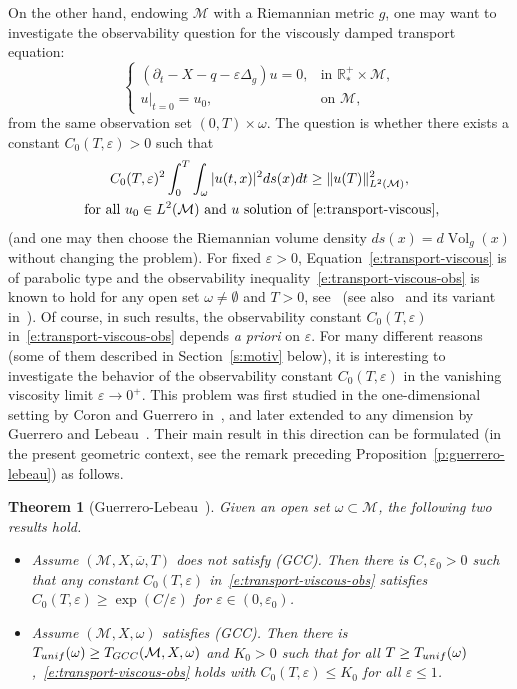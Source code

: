 \documentclass[11pt]{article}
\numberwithin{equation}{section}
\newcommand{\GCC}{\textup{GCC}}
\newcommand{\pGCC}{\textup{(GCC)}\xspace}
\newcommand{\unif}{\textup{unif}}
\newtheorem{theorem}[lemma]{Theorem}
\theoremstyle{definition}
\newcommand{\M}{\ensuremath{\mathcal M}}
\newcommand{\mb}[1]{\ensuremath{\mathbb{#1}}}
\newcommand{\R}{{\mb{R}}}
\DeclareMathOperator{\Vol}{Vol}
\let\d\partial
\let\eps\varepsilon
\let\q q
\begin{document}
On the other hand, endowing $\M$ with a Riemannian metric $g$, one may want to investigate the observability question for the viscously damped transport equation:
\begin{equation}
\label{e:transport-viscous}
\begin{cases}
(\d_t - X -\q - \eps \Delta_g ) u = 0, & \text{in } \R^+_*\times \M, \\
u|_{t=0} = u_0, & \text{on } \M,
\end{cases}
\end{equation}
from the same observation set $(0,T)\times\omega$. The question is whether there exists a constant $C_0(T,\eps)>0$ such that
\begin{multline}
\label{e:transport-viscous-obs}
C_0(T,\eps)^2 \int_0^T\int_\omega |u(t,x)|^2 ds(x)dt \geq \|u (T)\|_{L^2(\M)}^2, \\
\text{ for all } u_0 \in L^2(\M) \text{ and } u \text{ solution of~\eqref{e:transport-viscous}},
\end{multline}
(and one may then choose the Riemannian volume density $ds(x) = d\Vol_g(x)$ without changing the problem).
For fixed $\eps>0$, Equation~\eqref{e:transport-viscous} is of parabolic type and the observability inequality~\eqref{e:transport-viscous-obs} is known to hold for any open set $\omega \neq \emptyset$ and $T>0$, see~\cite{FI:96} (see also~\cite{LR:95} and its variant in~\cite{Lea:10}).
Of course, in such results, the observability constant $C_0(T,\eps)$ in~\eqref{e:transport-viscous-obs} depends {\em a priori} on $\eps$.
For many different reasons (some of them described in Section~\ref{s:motiv} below), it is interesting to investigate the behavior of the observability constant $C_0(T,\eps)$ in the vanishing viscosity limit $\eps \to 0^+$. This problem was first studied in the one-dimensional setting by Coron and Guerrero in~\cite{CG:05}, and later extended to any dimension by Guerrero and Lebeau~\cite{GL:07}. Their main result in this direction can be formulated (in the present geometric context, see the remark preceding Proposition~\ref{p:guerrero-lebeau}) as follows.
\begin{theorem}[Guerrero-Lebeau~\cite{GL:07}]
\label{t:Leb-Guer}
Given an open set $\omega \subset \M$, the following two results hold.
\begin{itemize}
\item \cite[Th.\,1]{GL:07} Assume $(\M,X,\overline{\omega}, T)$ does not satisfy \pGCC. Then there is \hbox{$C, \eps_0>0$} such that any constant $C_0(T,\eps)$ in~\eqref{e:transport-viscous-obs} satisfies $C_0(T,\eps)\geq \exp(C/\eps)$ for $\eps \in (0,\eps_0)$.
\item \cite[Th.\,3]{GL:07} Assume $(\M,X,\omega)$ satisfies \pGCC. Then there is $T_{\unif}(\omega) \geq T_{\GCC}(\M,X,\omega)$ and $K_0>0$ such that for all $T\geq T_{\unif}(\omega)$,~\eqref{e:transport-viscous-obs} holds with $C_0(T,\eps)\leq K_0$ for all $\eps \leq 1$.
\end{itemize}
\end{theorem}
\end{document}
